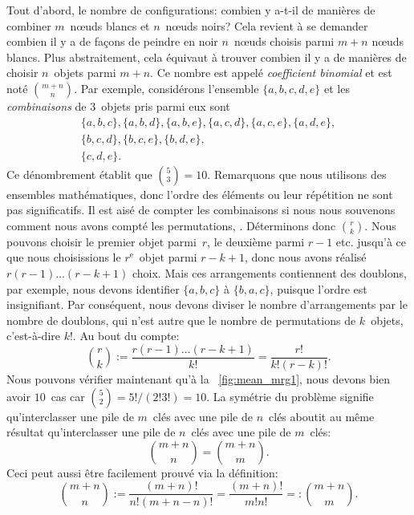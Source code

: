 Tout d'abord, le nombre de configurations: combien y a-t-il de
manières de combiner \(m\)~nœuds blancs et \(n\)~nœuds noirs?
Cela revient à se demander combien il y a de façons de peindre en noir
\(n\)~nœuds choisis parmi \(m+n\) nœuds blancs. Plus
abstraitement, cela équivaut à trouver combien il y a de manières de
choisir \(n\)~objets parmi \(m+n\). Ce nombre est appelé
\emph{coefficient binomial} et est noté
\(\binom{m+n}{n}\). Par exemple, considérons l'ensemble
\(\{a,b,c,d,e\}\) et les \emph{combinaisons} de
\(3\)~objets pris parmi eux sont
\begin{gather*}
\{a,b,c\},\{a,b,d\},\{a,b,e\},\{a,c,d\},\{a,c,e\},\{a,d,e\},\\
\{b,c,d\},\{b,c,e\},\{b,d,e\},\\
\{c,d,e\}.
\end{gather*}
Ce dénombrement établit que \(\binom{5}{3} = 10\). Remarquons que nous
utilisons des ensembles mathématiques, donc l'ordre des éléments ou
leur répétition ne sont pas significatifs. Il est aisé de compter les
combinaisons si nous nous souvenons comment nous avons compté les
permutations, . Déterminons donc
\(\binom{r}{k}\). Nous pouvons choisir le premier objet parmi~\(r\),
le deuxième parmi \(r-1\) etc. jusqu'à ce que nous choisissions le
\(r^\text{e}\)~objet parmi \(r-k+1\), donc nous avons réalisé
\(r(r-1)\dots(r-k+1)\) choix. Mais ces arrangements contiennent des
doublons, par exemple, nous devons identifier \(\{a,b,c\}\) à
\(\{b,a,c\}\), puisque l'ordre est insignifiant. Par conséquent, nous
devons diviser le nombre d'arrangements par le nombre de doublons, qui
n'est autre que le nombre de permutations de \(k\)~objets,
c'est-à-dire \(k!\). Au bout du compte:
\begin{equation*}
\binom{r}{k} := \frac{r(r-1)\ldots(r-k+1)}{k!} =
\frac{r!}{k!(r-k)!}.
\end{equation*}
Nous pouvons vérifier maintenant qu'à la \fig~\vref{fig:mean_mrg1},
nous devons bien avoir \(10\)~cas car \(\binom{5}{2} = 5!/(2!3!) =
10\). La symétrie du problème signifie qu'interclasser une pile de
\(m\)~clés avec une pile de \(n\)~clés aboutit au même résultat
qu'interclasser une pile de \(n\)~clés avec une pile de \(m\)~clés:
\begin{equation*}
\binom{m+n}{n} = \binom{m+n}{m}.
\end{equation*}
Ceci peut aussi être facilement prouvé via la définition:
\begin{equation*}
\binom{m+n}{n} := \frac{(m+n)!}{n!(m+n-n)!} =
\frac{(m+n)!}{m!n!} =: \binom{m+n}{m}.
\end{equation*}
